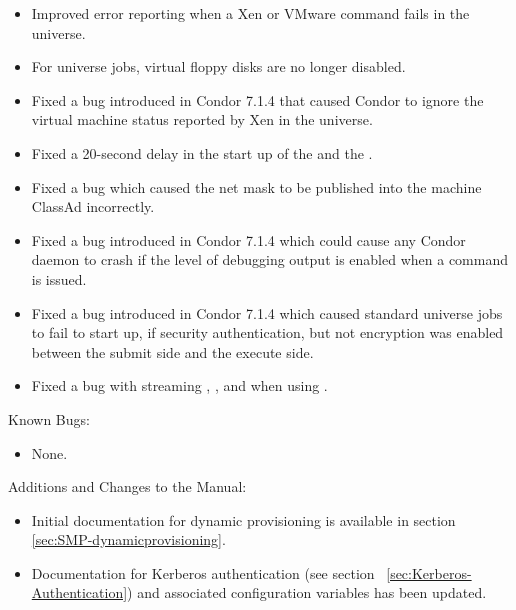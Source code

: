 \begin{itemize}
\item Improved error reporting when a Xen or VMware command fails in the
 universe.

\item For  universe jobs,
virtual floppy disks are no longer disabled.

\item Fixed a bug introduced in Condor 7.1.4 that caused Condor to
ignore the virtual machine status reported by Xen in the  universe.

\item Fixed a 20-second delay in the start up of the  and
the .

\item Fixed a bug which caused the net mask to be published
  into the machine ClassAd incorrectly.

\item Fixed a bug introduced in Condor 7.1.4 which could cause any
  Condor daemon to crash if the level of debugging output 
  is enabled when a  command is issued.

\item Fixed a bug introduced in Condor 7.1.4 which caused standard universe
jobs to fail to start up, if security authentication, but not encryption was
enabled between the submit side and the execute side.


\item Fixed a bug with streaming , , and
 when using .


\end{itemize}

\noindent Known Bugs:

\begin{itemize}

\item None.

\end{itemize}

\noindent Additions and Changes to the Manual:

\begin{itemize}

\item Initial documentation for dynamic provisioning is available
in section~ \ref{sec:SMP-dynamicprovisioning}.

\item Documentation for Kerberos authentication
(see section~ \ref{sec:Kerberos-Authentication})
and associated configuration variables has been updated.

\end{itemize}

